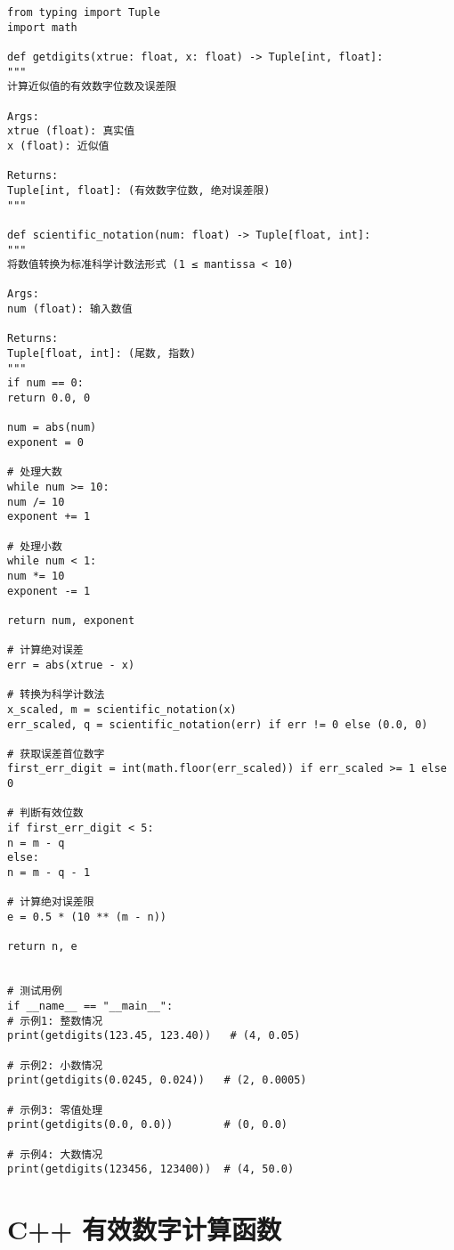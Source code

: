 \documentclass[UTF8]{ctexart}
\begin{document}
\begin{lstlisting}[caption={Python 有效数字计算函数 (getdigits.py)}, label=lst:getdigits-python]
from typing import Tuple
import math

def getdigits(xtrue: float, x: float) -> Tuple[int, float]:
"""
计算近似值的有效数字位数及误差限

Args:
xtrue (float): 真实值
x (float): 近似值

Returns:
Tuple[int, float]: (有效数字位数, 绝对误差限)
"""

def scientific_notation(num: float) -> Tuple[float, int]:
"""
将数值转换为标准科学计数法形式 (1 ≤ mantissa < 10)

Args:
num (float): 输入数值

Returns:
Tuple[float, int]: (尾数, 指数)
"""
if num == 0:
return 0.0, 0

num = abs(num)
exponent = 0

# 处理大数
while num >= 10:
num /= 10
exponent += 1

# 处理小数
while num < 1:
num *= 10
exponent -= 1

return num, exponent

# 计算绝对误差
err = abs(xtrue - x)

# 转换为科学计数法
x_scaled, m = scientific_notation(x)
err_scaled, q = scientific_notation(err) if err != 0 else (0.0, 0)

# 获取误差首位数字
first_err_digit = int(math.floor(err_scaled)) if err_scaled >= 1 else 0

# 判断有效位数
if first_err_digit < 5:
n = m - q
else:
n = m - q - 1

# 计算绝对误差限
e = 0.5 * (10 ​**​ (m - n))

return n, e


# 测试用例
if __name__ == "__main__":
# 示例1: 整数情况
print(getdigits(123.45, 123.40))   # (4, 0.05)

# 示例2: 小数情况
print(getdigits(0.0245, 0.024))   # (2, 0.0005)

# 示例3: 零值处理
print(getdigits(0.0, 0.0))        # (0, 0.0)

# 示例4: 大数情况
print(getdigits(123456, 123400))  # (4, 50.0)
\end{lstlisting}

\section{C++ 有效数字计算函数}
\end{document}

